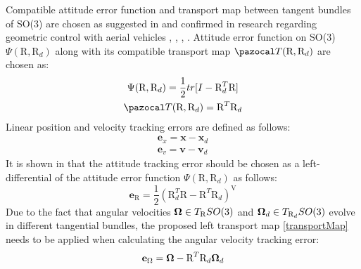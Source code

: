 Compatible attitude error function and transport map between tangent bundles of SO(3) are chosen as suggested in \cite{bulloBook} and confirmed in research regarding geometric control with aerial vehicles \cite{LeeClanak1}, \cite{LeeClanak2}, \cite{LeeClanak3}, \cite{LeeClanak4}. Attitude error function on SO(3) $	\Psi(\text{R}, \text{R}_d)$  along with its compatible transport map $\Ta(\text{R}, \text{R}_d)$ are chosen as:
\begin{gather}
	\Psi(\text{R}, \text{R}_d) = \frac{1}{2}tr[I - \text{R}_d^T\text{R}] \label{attErr} \\ 
	\Ta(\text{R}, \text{R}_d) = \text{R}^T \text{R}_d \label{transportMap}
\end{gather}
Linear position and velocity tracking errors are defined as follows:
\begin{gather}
	\textbf{e}_x = \textbf{x} - \textbf{x}_d \\
	\textbf{e}_v = \textbf{v} - \textbf{v}_d \label{linear_error}
\end{gather}
It is shown in \cite{bulloBook} that the attitude tracking error should be chosen as a left-differential of the attitude error function $\Psi(\text{R}, \text{R}_d)$ as follows:
\begin{equation}
	\textbf{e}_\text{R} = \frac{1}{2}(\text{R}_d^T\text{R} - \text{R}^T\text{R}_d)^\text{V}
\end{equation}
Due to the fact that angular velocities $\boldsymbol{\Omega} \in T_\text{R}SO(3)$ and $\boldsymbol{\Omega}_d \in T_{\text{R}_d}SO(3)$ evolve in different tangential bundles, the proposed left transport map \ref{transportMap} needs to be applied when calculating the angular velocity tracking error:
\begin{equation}
	\textbf{e}_\Omega = \boldsymbol{\Omega} - \text{R}^T\text{R}_d\boldsymbol{\Omega}_d \label{angular_error}
\end{equation}

